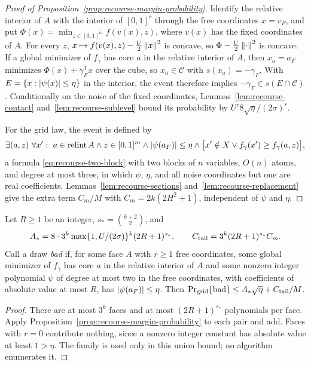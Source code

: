 \begin{proof}[Proof of Proposition~\ref{prop:recourse-margin-probability}]
Identify the relative interior of $A$ with the interior of
$[0,1]^r$ through the free coordinates $x=v_F$, and put
$\Phi(x)=\min_{z\in[0,1]^m}f(v(x),z)$, where $v(x)$ has the fixed
coordinates of $A$. For every $z$, $x\mapsto f(v(x),z)-\frac U2\left\lVert x\right\rVert^2$
is concave, so $\Phi-\frac U2\left\lVert\cdot\right\rVert^2$ is concave. If a global
minimizer of $f_\gamma$ has core $a$ in the relative interior of $A$,
then $x_a=a_F$ minimizes $\Phi(x)+\gamma_F^{\mathsf T}x$ over the cube,
so $x_a\in\mathcal C$ with $s(x_a)=-\gamma_F$. With
$E=\{x:\left\lvert\psi(x)\right\rvert\le\eta\}$ in the interior, the event therefore
implies $-\gamma_F\in s(E\cap\mathcal C)$. Conditionally on the noise of
the fixed coordinates, Lemmas~\ref{lem:recourse-contact}
and~\ref{lem:recourse-sublevel} bound its probability by
$U^r8\sqrt\eta/(2\sigma)^r$.

For the grid law, the event is defined by
\[
 \exists(a,z)\ \forall x':\ a\in\operatorname{relint}A\wedge z\in[0,1]^m
 \wedge\abs{\psi(a_F)}\le\eta\wedge
 \bigl[x'\notin X\vee f_\gamma(x')\ge f_\gamma(a,z)\bigr],
\]
a formula \eqref{eq:recourse-two-block} with two blocks of $n$
variables, $O(n)$ atoms, and degree at most three, in which $\psi$, $\eta$,
and all noise coordinates but one are real coefficients.
Lemmas~\ref{lem:recourse-sections} and~\ref{lem:recourse-replacement}
give the extra term $C_m/M$ with $C_m=2k(2H^2+1)$, independent of $\psi$
and $\eta$.
\end{proof}

\begin{corollary}
\label{cor:recourse-margin-union}
Let $R\ge1$ be an integer, $s_*=\binom{k+2}2$, and
\[
 A_*=8\cdot3^k\max\{1,U/(2\sigma)\}^k(2R+1)^{s_*},\qquad
 C_{\rm tail}=3^k(2R+1)^{s_*}C_m .
\]
Call a draw \emph{bad} if, for some face $A$ with $r\ge1$ free
coordinates, some global minimizer of $f_\gamma$ has core $a$ in the
relative interior of $A$ and some nonzero integer polynomial $\psi$ of
degree at most two in the free coordinates, with coefficients of
absolute value at most $R$, has $\left\lvert\psi(a_F)\right\rvert\le\eta$. Then
$\Pr_{\rm grid}\{\text{bad}\}\le A_*\sqrt\eta+C_{\rm tail}/M$.
\end{corollary}

\begin{proof}
There are at most $3^k$ faces and at most $(2R+1)^{s_*}$ polynomials per
face. Apply Proposition~\ref{prop:recourse-margin-probability} to each
pair and add. Faces with $r=0$ contribute nothing, since a nonzero
integer constant has absolute value at least $1>\eta$. The family is
used only in this union bound; no algorithm enumerates it.
\end{proof}

